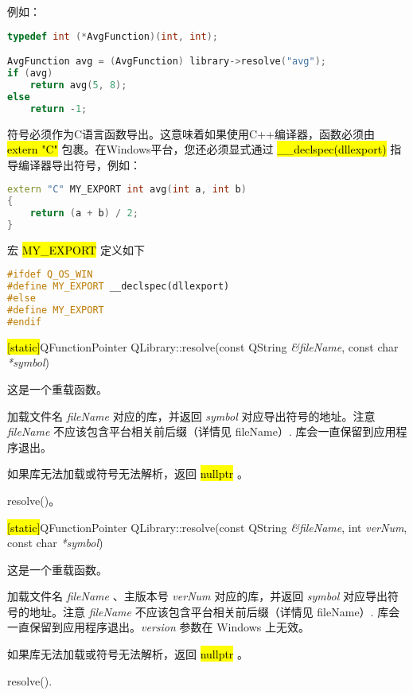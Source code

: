 例如：

\begin{lstlisting}[language=C++]
typedef int (*AvgFunction)(int, int);

AvgFunction avg = (AvgFunction) library->resolve("avg");
if (avg)
    return avg(5, 8);
else
    return -1;
\end{lstlisting}

符号必须作为C语言函数导出。这意味着如果使用C++编译器，函数必须由
\hl{extern "C"} 包裹。在Windows平台，您还必须显式通过 \hl{\_\_declspec(dllexport)}
指导编译器导出符号，例如：

\begin{lstlisting}[language=C++]
extern "C" MY_EXPORT int avg(int a, int b)
{
    return (a + b) / 2;
}
\end{lstlisting}

宏 \hl{MY\_EXPORT} 定义如下

\begin{lstlisting}[language=C++]
#ifdef Q_OS_WIN
#define MY_EXPORT __declspec(dllexport)
#else
#define MY_EXPORT
#endif
\end{lstlisting}

\hl{[static]}QFunctionPointer QLibrary::resolve(const QString \emph{\&fileName}, const char \emph{*symbol})

这是一个重载函数。

加载文件名 \emph{fileName} 对应的库，并返回 \emph{symbol} 对应导出符号的地址。注意 \emph{fileName} 不应该包含平台相关前后缀（详情见 fileName）. 库会一直保留到应用程序退出。

如果库无法加载或符号无法解析，返回 \hl{nullptr} 。

\begin{seeAlso}
resolve()。
\end{seeAlso}

\hl{[static]}QFunctionPointer QLibrary::resolve(const QString
\emph{\&fileName}, int \emph{verNum}, const char \emph{*symbol})

这是一个重载函数。

加载文件名 \emph{fileName} 、主版本号 \emph{verNum} 对应的库，并返回 \emph{symbol} 对应导出符号的地址。注意 \emph{fileName} 不应该包含平台相关前后缀（详情见 fileName）. 库会一直保留到应用程序退出。\emph{version} 参数在 Windows 上无效。

如果库无法加载或符号无法解析，返回 \hl{nullptr} 。

\begin{seeAlso}
resolve().
\end{seeAlso}

